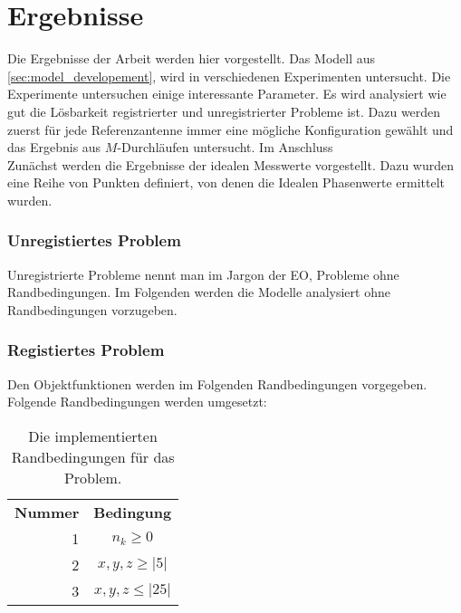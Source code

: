 \section{Ergebnisse}
%
Die Ergebnisse der Arbeit werden hier vorgestellt. Das Modell aus \ref{sec:model_developement}, wird in verschiedenen Experimenten untersucht. Die Experimente untersuchen einige interessante Parameter. Es wird analysiert wie gut die Lösbarkeit registrierter und unregistrierter Probleme ist. Dazu werden zuerst für jede Referenzantenne immer eine mögliche Konfiguration gewählt und das Ergebnis aus $M$-Durchläufen untersucht. Im Anschluss 
\\
Zunächst werden die Ergebnisse der idealen Messwerte vorgestellt. Dazu wurden eine Reihe von Punkten definiert, von denen die Idealen Phasenwerte ermittelt wurden.
%
\subsubsection{Unregistiertes Problem}
%
Unregistrierte Probleme nennt man im Jargon der EO, Probleme ohne Randbedingungen. Im Folgenden werden die Modelle analysiert ohne Randbedingungen vorzugeben. 
%
\subsubsection{Registiertes Problem}
%
Den Objektfunktionen werden im Folgenden Randbedingungen vorgegeben. Folgende Randbedingungen werden umgesetzt:
%
\begin{table} [ht!]
	\begin{center}
		\begin{tabular}{rc}
			\textbf{Nummer} & \textbf{Bedingung} \\
			1 & $n_k\ge0$ \\
			2 & $x,y,z \ge |5|$\\
			3 & $x,y,z \le |25|$\\
%			
		\end{tabular}
	\end{center}
	\caption[Randbedingungen für Optimierung]{Die implementierten Randbedingungen für das Problem.}
	\label{tab:registrations}
\end{table}
%

